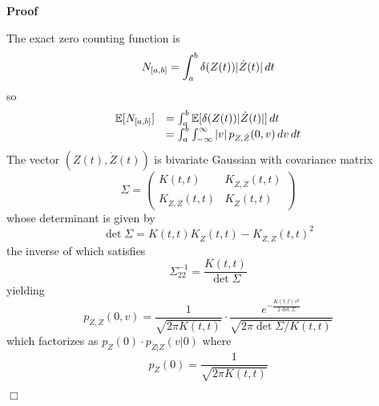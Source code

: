 \documentclass{article}
\newenvironment{proof}{\noindent\textbf{Proof\ }}{\hspace*{\fill}$\Box$\medskip}
\begin{document}
\begin{proof}
  
  \begin{enumerate}
    The exact zero counting function is
    \begin{equation}
      N_{[a, b]} = \int_a^b \delta (Z (t)) | \dot{Z} (t) |  \hspace{0.17em} dt
    \end{equation}
    so
    \begin{equation}
      \label{eq:expectation} \begin{array}{ll}
        \mathbb{E} [N_{[a, b]}] & = \int_a^b \mathbb{E} [\delta (Z (t)) |
        \dot{Z} (t) |]  \hspace{0.17em} dt\\
        & = \int_a^b \int_{- \infty}^{\infty} |v|  \hspace{0.17em} p_{Z,
        \dot{Z}} (0, v)  \hspace{0.17em} dv \hspace{0.17em} dt
      \end{array}
    \end{equation}
    The vector $(Z (t), \dot{Z} (t))$ is bivariate Gaussian with covariance
    matrix
    \begin{equation}
      \Sigma = \left(\begin{array}{cc}
        K (t, t) & K_{Z, \dot{Z}} (t, t)\\
        K_{Z, \dot{Z}} (t, t) & K_{\dot{Z}} (t, t)
      \end{array}\right)
    \end{equation}
    whose determinant is given by
    \begin{equation}
      \det \Sigma = K (t, t) K_{\dot{Z}} (t, t) - K_{Z, \dot{Z}} (t, t)^2
    \end{equation}
    the inverse of which satisfies
    \begin{equation}
      \Sigma^{- 1}_{22} = \frac{K (t, t)}{\det \Sigma}
    \end{equation}
    yielding
    \begin{equation}
      p_{Z, \dot{Z}} (0, v) = \frac{1}{\sqrt{2 \pi K (t, t)}} \cdot \frac{e^{-
      \frac{K (t, t) v^2}{2 \det \Sigma}}}{\sqrt{2 \pi \det \Sigma / K (t,
      t)}}
    \end{equation}
    which factorizes as $p_Z (0) \cdot p_{\dot{Z} |Z} (v| 0)$ where
    \begin{equation}
      p_Z (0) = \frac{1}{\sqrt{2 \pi K (t, t)}}
    \end{equation}

\end{enumerate}
\end{proof}
\end{document}
